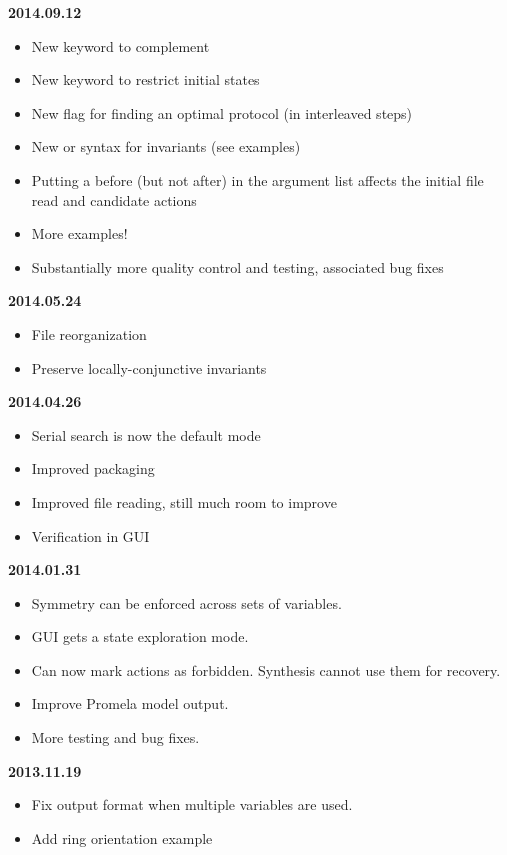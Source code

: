 \textbf{2014.09.12}
\begin{itemize}
\item New  keyword to complement 
\item New  keyword to restrict initial states
\item New  flag for finding an optimal protocol (in interleaved steps)
\item New  or  syntax for invariants (see examples)
\item Putting a  before (but not after)  in the argument list affects the initial file read and candidate actions
\item More examples!
\item Substantially more quality control and testing, associated bug fixes
\end{itemize}
\textbf{2014.05.24}
\begin{itemize}
\item File reorganization
\item Preserve locally-conjunctive invariants
\end{itemize}
\textbf{2014.04.26}
\begin{itemize}
\item Serial search is now the default mode
\item Improved packaging
\item Improved file reading, still much room to improve
\item Verification in GUI
\end{itemize}
\textbf{2014.01.31}
\begin{itemize}
\item Symmetry can be enforced across sets of variables.
\item GUI gets a state exploration mode.
\item Can now mark actions as forbidden. Synthesis cannot use them for recovery.
\item Improve Promela model output.
\item More testing and bug fixes.
\end{itemize}
\textbf{2013.11.19}
\begin{itemize}
\item Fix output format when multiple variables are used.
\item Add ring orientation example
\end{itemize}

